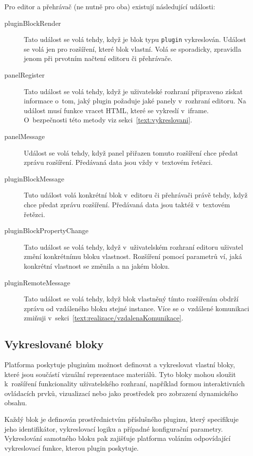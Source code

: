 Pro editor a přehrávač (ne nutně pro oba) existují následující události:

\begin{description}
    \item[pluginBlockRender] Tato událost se volá tehdy, když je blok typu \texttt{plugin} vykreslován. Událost se volá jen pro rozšíření, které blok vlastní. Volá se sporadicky, zpravidla jenom při prvotním načtení editoru či přehrávače. 
    \item[panelRegister] Tato událost se volá tehdy, když je uživatelské rozhraní připraveno získat informace o~tom, jaký plugin požaduje jaké panely v~rozhraní editoru. Na událost musí funkce vracet HTML, které se vykreslí v~iframe. O~bezpečnosti této metody viz sekci~\ref{text:vykreslovani}.
    \item[panelMessage] Událost se volá tehdy, když panel přiřazen tomuto rozšíření chce předat zprávu rozšíření. Předávaná data jsou vždy v~textovém řetězci.
    \item[pluginBlockMessage] Tuto událost volá konkrétní blok v~editoru či přehrávači právě tehdy, když chce předat zprávu rozšíření. Předávaná data jsou taktéž v~textovém řetězci.
    \item[pluginBlockPropertyChange] Tato událost se volá tehdy, když v~uživatelském rozhraní editoru uživatel změní konkrétnímu bloku vlastnost. Rozšíření pomocí parametrů ví, jaká konkrétní vlastnost se změnila a na jakém bloku.
    \item[pluginRemoteMessage] Tato událost se volá tehdy, když blok vlastněný tímto rozšířením obdrží zprávu od vzdáleného bloku stejné instance. Více se o~vzdálené komunikaci zmiňuji v~sekci~\ref{text:realizace/vzdalenaKomunikace}. 
\end{description}


\subsection{Vykreslované bloky}

Platforma poskytuje pluginům možnost definovat a vykreslovat vlastní bloky, které jsou součástí vizuální reprezentace materiálů.
Tyto bloky mohou sloužit k~rozšíření funkcionality uživatelského rozhraní, například formou interaktivních ovládacích prvků, vizualizací nebo jako prostředek pro zobrazení dynamického obsahu.

Každý blok je definován prostřednictvím příslušného pluginu, který specifikuje jeho identifikátor, vykreslovací logiku a případné konfigurační parametry. 
Vykreslování samotného bloku pak zajišťuje platforma voláním odpovídající vykreslovací funkce, kterou plugin poskytuje. 

